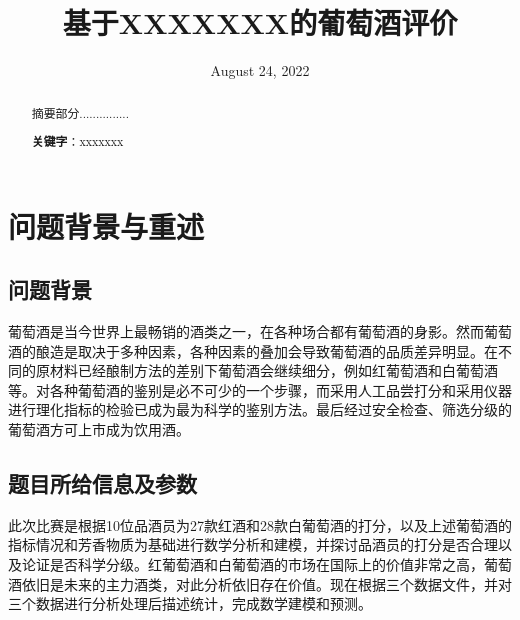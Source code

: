 \documentclass[UTF8]{ctexart}
\title{基于\textbf{XXXXX}XX的葡萄酒评价}
\date{August 24, 2022}
\begin{document}
    \maketitle
	\renewcommand{\abstractname}{\Large 摘要\\}
	\begin{abstract}
		\normalsize
		

		摘要部分...............

		\textbf{关键字}：xxxxxxx
	\end{abstract}

	
	\section{问题背景与重述}
		\subsection{问题背景}
		葡萄酒是当今世界上最畅销的酒类之一，在各种场合都有葡萄酒的身影。然而葡萄酒的酿造是取决于多种因素，各种因素的叠加会导致葡萄酒的品质差异明显。在不同的原材料已经酿制方法的差别下葡萄酒会继续细分，例如红葡萄酒和白葡萄酒等。对各种葡萄酒的鉴别是必不可少的一个步骤，而采用人工品尝打分和采用仪器进行理化指标的检验已成为最为科学的鉴别方法。最后经过安全检查、筛选分级的葡萄酒方可上市成为饮用酒。
		\subsection{题目所给信息及参数}
		此次比赛是根据10位品酒员为27款红酒和28款白葡萄酒的打分，以及上述葡萄酒的指标情况和芳香物质为基础进行数学分析和建模，并探讨品酒员的打分是否合理以及论证是否科学分级。红葡萄酒和白葡萄酒的市场在国际上的价值非常之高，葡萄酒依旧是未来的主力酒类，对此分析依旧存在价值。现在根据三个数据文件，并对三个数据进行分析处理后描述统计，完成数学建模和预测。
\end{document}
